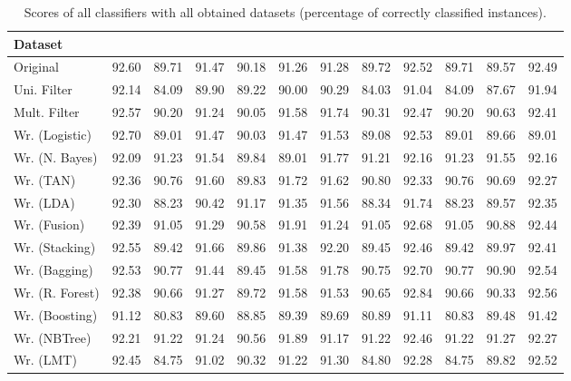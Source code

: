 \documentclass[a4paper,11pt]{article}
\begin{document}
\begin{table}[h]
\centering
\begin{tabular}{||l|l|l|l|l|l|l|l|l|l|l|l||}
	\hline
	Dataset &
	\rotatebox[origin=c]{90}{Logistic} &
	\rotatebox[origin=c]{90}{Naive Bayes} &
	\rotatebox[origin=c]{90}{TAN} &
	\rotatebox[origin=c]{90}{LDA} &
	\rotatebox[origin=c]{90}{Fusion} &
	\rotatebox[origin=c]{90}{Stacking} &
	\rotatebox[origin=c]{90}{Bagging} &
	\rotatebox[origin=c]{90}{Random Forest} &
	\rotatebox[origin=c]{90}{Boosting} &
	\rotatebox[origin=c]{90}{NBTree} &
	\rotatebox[origin=c]{90}{LMT}\\
	\hline
	Original & 92.60 & 89.71 & 91.47 & 90.18 & 91.26 & 91.28 & 89.72 & 92.52 & 89.71 & 89.57 & 92.49\\
	Uni. Filter & 92.14 & 84.09 & 89.90 & 89.22 & 90.00 & 90.29 & 84.03 & 91.04 & 84.09 & 87.67 & 91.94\\
	Mult. Filter & 92.57 & 90.20 & 91.24 & 90.05 & 91.58 & 91.74 & 90.31 & 92.47 & 90.20 & 90.63 & 92.41\\
	Wr. (Logistic) & 92.70 & 89.01 & 91.47 & 90.03 & 91.47 & 91.53 & 89.08 & 92.53 & 89.01 & 89.66 & 89.01\\
	Wr. (N. Bayes) & 92.09 & 91.23 & 91.54 & 89.84 & 89.01 & 91.77 & 91.21 & 92.16 & 91.23 & 91.55 & 92.16\\
	Wr. (TAN) & 92.36 & 90.76 & 91.60 & 89.83 & 91.72 & 91.62 & 90.80 & 92.33 & 90.76 & 90.69 & 92.27\\
	Wr. (LDA) & 92.30 & 88.23 & 90.42 & 91.17 & 91.35 & 91.56 & 88.34 & 91.74 & 88.23 & 89.57 & 92.35\\
	Wr. (Fusion) & 92.39 & 91.05 & 91.29 & 90.58 & 91.91 & 91.24 & 91.05 & 92.68 & 91.05 & 90.88 & 92.44\\
	Wr. (Stacking) & 92.55 & 89.42 & 91.66 & 89.86 & 91.38 & 92.20 & 89.45 & 92.46 & 89.42 & 89.97 & 92.41\\
	Wr. (Bagging) & 92.53 & 90.77 & 91.44 & 89.45 & 91.58 & 91.78 & 90.75 & 92.70 & 90.77 & 90.90 & 92.54\\
	Wr. (R. Forest) & 92.38 & 90.66 & 91.27 & 89.72 & 91.58 & 91.53 & 90.65 & 92.84 & 90.66 & 90.33 & 92.56\\
	Wr. (Boosting) & 91.12 & 80.83 & 89.60 & 88.85 & 89.39 & 89.69 & 80.89 & 91.11 & 80.83 & 89.48 & 91.42\\
	Wr. (NBTree) & 92.21 & 91.22 & 91.24 & 90.56 & 91.89 & 91.17 & 91.22 & 92.46 & 91.22 & 91.27 & 92.27\\
	Wr. (LMT) & 92.45 & 84.75 & 91.02 & 90.32 & 91.22 & 91.30 & 84.80 & 92.28 & 84.75 & 89.82 & 92.52\\
    \hline 
\end{tabular}
\caption{Scores of all classifiers with all obtained datasets (percentage of correctly classified instances).}
\label{tab:table6}
\end{table}
\end{document}
